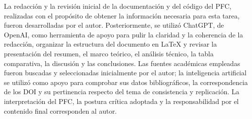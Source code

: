 \documentclass[11pt,a4paper]{article}
\begin{document}
La redacción y la revisión inicial de la documentación y del código del PFC, realizadas con el propósito de obtener la información necesaria para esta tarea, fueron desarrolladas por el autor. Posteriormente, se utilizó ChatGPT, de OpenAI, como herramienta de apoyo para pulir la claridad y la coherencia de la redacción, organizar la estructura del documento en LaTeX y revisar la presentación del resumen, el marco teórico, el análisis técnico, la tabla comparativa, la discusión y las conclusiones. Las fuentes académicas empleadas fueron buscadas y seleccionadas inicialmente por el autor; la inteligencia artificial se utilizó como apoyo para comprobar sus datos bibliográficos, la correspondencia de los DOI y su pertinencia respecto del tema de consistencia y replicación. La interpretación del PFC, la postura crítica adoptada y la responsabilidad por el contenido final corresponden al autor.

\printbibliography
\end{document}
